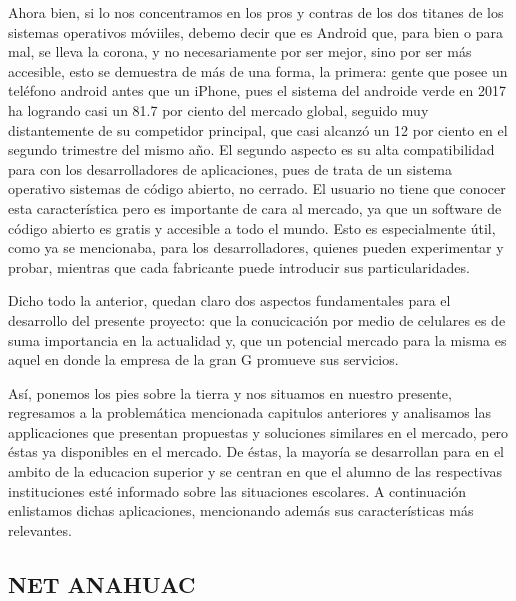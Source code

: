 \noindent
Ahora bien, si lo nos concentramos en los pros y contras de los dos titanes de los sistemas operativos móviiles, debemo decir que es Android que, para bien o para mal, se lleva la corona, y no necesariamente por ser mejor, sino por ser más accesible, esto se demuestra de más de una forma, la primera: gente que posee un teléfono android antes que un iPhone, pues el sistema del androide verde en 2017 ha logrando casi un 81.7 por ciento del mercado global, seguido muy distantemente de su competidor principal, que casi alcanzó un 12 por ciento en el segundo trimestre del mismo año.		
El segundo aspecto es su alta compatibilidad para con los desarrolladores de aplicaciones, pues de trata de un sistema operativo sistemas de código abierto, no cerrado. El usuario no tiene que conocer esta característica pero es importante de cara al 
mercado, ya que un software de código abierto es gratis y accesible a todo el mundo. Esto es especialmente útil, como ya se mencionaba, para los desarrolladores, quienes pueden experimentar y probar, mientras que cada fabricante puede introducir sus particularidades. \cite{IDC}

\noindent
\newline
Dicho todo la anterior, quedan claro dos aspectos fundamentales para el desarrollo del presente proyecto: que la conucicación por medio de celulares es de suma importancia en la actualidad y, que un potencial mercado para la misma es aquel en donde la empresa de la gran G promueve sus servicios.

\noindent
Así, ponemos los pies sobre la tierra y nos situamos en nuestro presente, regresamos a la problemática mencionada capitulos anteriores y analisamos las applicaciones que presentan propuestas y soluciones similares en el mercado, pero éstas ya disponibles en el mercado.
De éstas, la mayoría se desarrollan para en el ambito de la educacion superior y se centran en que el alumno de las respectivas instituciones esté informado sobre las situaciones escolares.
A continuación enlistamos dichas aplicaciones, mencionando además sus características más relevantes.

\pagebreak
\subsection{NET ANAHUAC}

